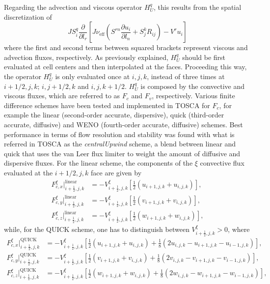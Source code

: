 Regarding the advection and viscous operator $H^q_U$, this results from the spatial discretization of
\begin{equation}
	JS^q_i  \frac{\partial}{\partial l_r}\left[J\nu_\text{eff}\left(S^{rn}\frac{\partial u_i}{\partial l_n} + S^k_jR_{ij}\right) - V^ru_i\right] \label{eq:advDiffTerm}
\end{equation}
where the first and second terms between squared brackets represent viscous and advection fluxes, respectively. As previously explained, $H^q_U$ should be first evaluated at cell centers and then interpolated at the faces. Proceeding this way, the operator $H^q_U$ is only evaluated once at $i,j,k$, instead of three times at $i+1/2,j,k$; $i,j+1/2,k$ and $i,j,k+1/2$. $H^q_U$ is composed by the convective and viscous fluxes, which are referred to as $F_c$ and $F_v$, respectively. Various finite difference schemes have been tested and implemented in TOSCA for $F_c$, for example the linear (second-order
accurate, dispersive), quick (third-order accurate, diffusive) and \acrshort{WENO} (fourth-order accurate, diffusive) schemes. Best performance in terms of flow resolution and stability was found with what is referred in TOSCA as the \textit{centralUpwind} scheme, a blend between linear and quick that uses the van Leer flux limiter to weight the amount of diffusive and dispersive fluxes. For the linear scheme, the components of the $\xi$ convective flux evaluated at the $i+1/2,j,k$ face are given by 
\begin{align}
	F^\xi_{c,x}\bigg|^\text{linear}_{i+\frac{1}{2},j,k} &= -V^\xi_{i+\frac{1}{2},j,k} \left[\frac{1}{2}\left(u_{i+1,j,k}+u_{i,j,k}\right)\right], \nonumber \\
	F^\xi_{c,y}\bigg|^\text{linear}_{i+\frac{1}{2},j,k} &= -V^\xi_{i+\frac{1}{2},j,k} \left[\frac{1}{2}\left(v_{i+1,j,k}+v_{i,j,k}\right)\right], \nonumber \\
	F^\xi_{c,z}\bigg|^\text{linear}_{i+\frac{1}{2},j,k} &= -V^\xi_{i+\frac{1}{2},j,k} \left[\frac{1}{2}\left(w_{i+1,j,k}+w_{i,j,k}\right)\right], \label{eq:linearFluxes} 
\end{align}
while, for the QUICK scheme, one has to distinguish between $V^\xi_{i+\frac{1}{2},j,k}>0$, where 
\begin{align}
	F^\xi_{c,x}\bigg|^\text{QUICK}_{i+\frac{1}{2},j,k} &= -V^\xi_{i+\frac{1}{2},j,k} \left[\frac{1}{2}\left(u_{i+1,j,k}+u_{i,j,k}\right) + \frac{1}{8}\left(2u_{i,j,k}-u_{i+1,j,k}-u_{i-1,j,k}\right)\right], \nonumber \\
	F^\xi_{c,y}\bigg|^\text{QUICK}_{i+\frac{1}{2},j,k} &= -V^\xi_{i+\frac{1}{2},j,k} \left[\frac{1}{2}\left(v_{i+1,j,k}+v_{i,j,k}\right) + \frac{1}{8}\left(2v_{i,j,k}-v_{i+1,j,k}-v_{i-1,j,k}\right)\right], \nonumber \\
	F^\xi_{c,z}\bigg|^\text{QUICK}_{i+\frac{1}{2},j,k} &= -V^\xi_{i+\frac{1}{2},j,k} \left[\frac{1}{2}\left(w_{i+1,j,k}+w_{i,j,k}\right) + \frac{1}{8}\left(2w_{i,j,k}-w_{i+1,j,k}-w_{i-1,j,k}\right)\right],  \label{eq:quickFluxes1}
\end{align}
